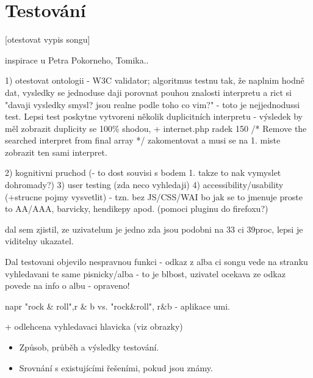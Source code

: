 \chapter{Testování}

[otestovat vypis songu]

inspirace u Petra Pokorneho, Tomika..

1) otestovat ontologii - W3C validator; algoritmus testnu tak, že naplnim hodně dat, vysledky se jednoduse daji porovnat pouhou znalosti interpretu a rict si "davaji vysledky smysl? jsou realne podle toho co vim?" - toto je nejjednodussi test. 
Lepsi test poskytne vytvoreni několik duplicitních interpretu - výsledek by měl zobrazit duplicity se 100\% shodou,
+ internet.php radek 150 /* Remove the searched interpret from final array */ zakomentovat a musi se na 1. miste zobrazit ten sami interpret. 

2) kognitivni pruchod (- to dost souvisi s bodem 1. takze to nak vymyslet dohromady?)
3) user testing (zda neco vyhledaji)
4) accessibility/usability (+strucne pojmy vysvetlit) - tzn. bez JS/CSS/WAI bo jak se to jmenuje proste to AA/AAA, barvicky, hendikepy apod. (pomoci pluginu do firefoxu?)

dal sem zjistil, ze uzivatelum je jedno zda jsou podobni na 33 ci 39proc, lepsi je viditelny ukazatel.

Dal testovani objevilo nespravnou funkci - odkaz z alba ci songu vede na stranku vyhledavani te same pisnicky/alba - to je blbost, uzivatel ocekava ze odkaz povede na info o albu - opraveno!

napr "rock \& roll",r \& b vs. "rock\&roll", r\&b - aplikace umi.

+ odlehcena vyhledavaci hlavicka (viz obrazky)


\begin{itemize}
 \item Způsob, průběh a výsledky testování.
 \item Srovnání s existujícími řešeními, pokud jsou známy.
\end{itemize} 

